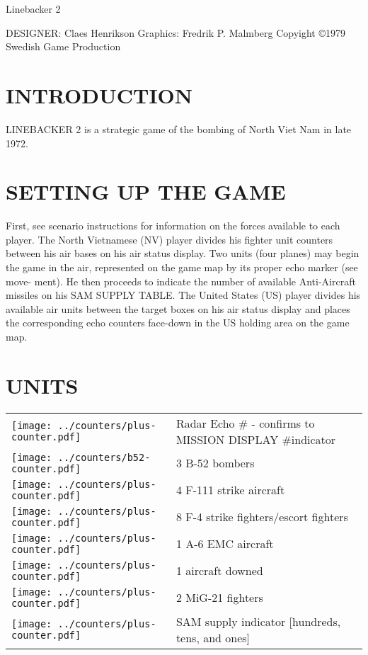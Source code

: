 Linebacker 2

DESIGNER: Claes Henrikson
Graphics: Fredrik P. Malmberg
Copyight ©1979
Swedish Game Production

\section*{INTRODUCTION}
LINEBACKER 2 is a strategic game 
of the bombing of North Viet Nam in 
late 1972.

\section*{SETTING UP THE GAME}
First, see scenario instructions for 
information on the forces available 
to each player. The North Vietnamese 
(NV) player divides his fighter unit 
counters between his air bases on his 
air status display. Two units (four 
planes) may begin the game in the 
air, represented on the game map by 
its proper echo marker (see move- 
ment). He then proceeds to indicate 
the number of available Anti-Aircraft 
missiles on his SAM SUPPLY TABLE. 
The United States (US) player 
divides his available air units between 
the target boxes on his air status 
display and places the corresponding 
echo counters face-down in the US 
holding area on the game map.

\newcommand{\bfiftytwo}{\texttt{[image: ../counters/b52-counter.pdf]}}
\newcommand{\plus}{\texttt{[image: ../counters/plus-counter.pdf]}}
\newcommand{\graphic}{\texttt{[image: ../counters/plus-counter.pdf]}}


\section*{UNITS}
\noindent
\begin{tabularx}{\linewidth}{@{} m{0.3in} X @{}}
   \graphic & Radar Echo \# - confirms to MISSION DISPLAY \#indicator \\ 
   \bfiftytwo & 3 B-52 bombers \\
   \graphic & 4 F-111 strike aircraft \\
   \graphic & 8 F-4 strike fighters/escort fighters \\
   \plus & 1 A-6 EMC aircraft \\
   \graphic & 1 aircraft downed \\
   \graphic & 2 MiG-21 fighters \\
   \graphic & SAM supply indicator [hundreds, tens, and ones] \\
 \end{tabularx}
 

